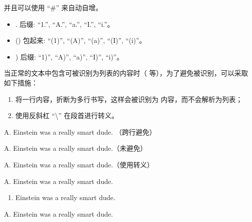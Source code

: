 \documentclass[a4paper,10pt,english]{sphinxmanual}
\begin{document}
\sphinxAtStartPar
并且可以使用 “\#” 来自动自增。

\sphinxAtStartPar
{}
\begin{itemize}
\item {} 
\sphinxAtStartPar
. 后缀: “1.”, “A.”, “a.”, “I.”, “i.”。

\item {} 
\sphinxAtStartPar
() 包起来: “(1)”, “(A)”, “(a)”, “(I)”, “(i)”。

\item {} 
\sphinxAtStartPar
) 后缀: “1)”, “A)”, “a)”, “I)”, “i)”。

\end{itemize}

\sphinxAtStartPar
当正常的文本中包含可被识别为列表的内容时（  等），为了避免被识别，可以采取如下措施：
\begin{enumerate}
%
\item {} 
\sphinxAtStartPar
将一行内容，折断为多行书写，这样会被识别为  内容，而不会解析为列表；

\item {} 
\sphinxAtStartPar
使用反斜杠 “\textbackslash{}” 在段首进行转义。

\end{enumerate}

\sphinxAtStartPar
{}

\begin{sphinxVerbatim}[commandchars=\\\{\}]
A. Einstein was a really
smart dude. （跨行避免）

A. Einstein was a really smart dude.（未避免）

\PYGZbs{}A. Einstein was a really smart dude.（使用\PYGZbs{}转义）
\end{sphinxVerbatim}

\sphinxAtStartPar
{}

\sphinxAtStartPar
A. Einstein was a really
smart dude.
\begin{enumerate}
%
\item {} 
\sphinxAtStartPar
Einstein was a really smart dude.

\end{enumerate}

\sphinxAtStartPar
A. Einstein was a really smart dude.
\end{document}
